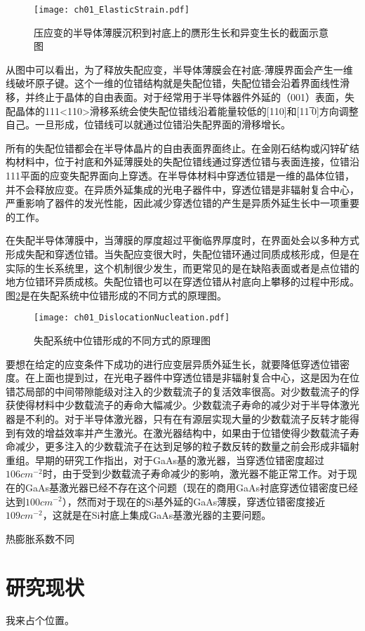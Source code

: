 \begin{figure}[ht]
	\centering
	\texttt{[image: ch01\_ElasticStrain.pdf]}
	\caption{压应变的半导体薄膜沉积到衬底上的赝形生长和异变生长的截面示意图}
	\label{fig:ElasticStrain}
\end{figure}

从图中可以看出，为了释放失配应变，半导体薄膜会在衬底-薄膜界面会产生一维线破坏原子键。这个一维的位错结构就是失配位错，失配位错会沿着界面线性滑移，并终止于晶体的自由表面。对于经常用于半导体器件外延的（001）表面，失配晶体的{111}<110>滑移系统会使失配位错线沿着能量较低的[110]和[11 ̅0]方向调整自己。一旦形成，位错线可以就通过位错沿失配界面的滑移增长。

所有的失配位错都会在半导体晶片的自由表面界面终止。在金刚石结构或闪锌矿结构材料中，位于衬底和外延薄膜处的失配位错线通过穿透位错与表面连接，位错沿{111}平面的应变失配界面向上穿透。在半导体材料中穿透位错是一维的晶体位错，并不会释放应变。在异质外延集成的光电子器件中，穿透位错是非辐射复合中心，严重影响了器件的发光性能，因此减少穿透位错的产生是异质外延生长中一项重要的工作。

在失配半导体薄膜中，当薄膜的厚度超过平衡临界厚度时，在界面处会以多种方式形成失配和穿透位错。当失配应变很大时，失配位错环通过同质成核形成，但是在实际的生长系统里，这个机制很少发生，而更常见的是在缺陷表面或者是点位错的地方位错环异质成核。失配位错也可以在穿透位错从衬底向上攀移的过程中形成。图\ref{fig:DislocationNucleation}是在失配系统中位错形成的不同方式的原理图。

\begin{figure}[ht]
	\centering
	\texttt{[image: ch01\_DislocationNucleation.pdf]}
	\caption{失配系统中位错形成的不同方式的原理图}
	\label{fig:DislocationNucleation}
\end{figure}

要想在给定的应变条件下成功的进行应变层异质外延生长，就要降低穿透位错密度。在上面也提到过，在光电子器件中穿透位错是非辐射复合中心，这是因为在位错芯局部的中间带隙能级对注入的少数载流子的复活效率很高。对少数载流子的俘获使得材料中少数载流子的寿命大幅减少。少数载流子寿命的减少对于半导体激光器是不利的。对于半导体激光器，只有在有源层实现大量的少数载流子反转才能得到有效的增益效率并产生激光。在激光器结构中，如果由于位错使得少数载流子寿命减少，更多注入的少数载流子在达到足够的粒子数反转的数量之前会形成非辐射重组。早期的研究工作指出，对于GaAs基的激光器，当穿透位错密度超过$106cm^{-2}$时，由于受到少数载流子寿命减少的影响，激光器不能正常工作。对于现在的GaAs基激光器已经不存在这个问题（现在的商用GaAs衬底穿透位错密度已经达到$100cm^{-2}$），然而对于现在的Si基外延的GaAs薄膜，穿透位错密度接近$109cm^{-2}$，这就是在Si衬底上集成GaAs基激光器的主要问题。

{\hei 热膨胀系数不同}


\section{研究现状}
我来占个位置。\cite{BUPT_Thesis_Format_2004}


\ifx\usechapbib\empty


\fi

